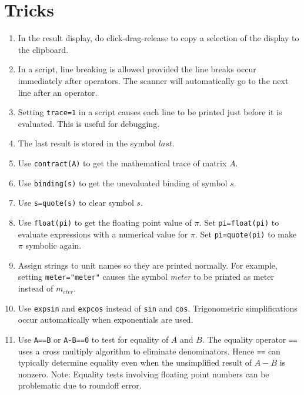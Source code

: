 \section{Tricks}
\begin{enumerate}

\item
In the result display, do click-drag-release to copy a selection of the display to the clipboard.

\item
In a script, line breaking is allowed provided the line breaks occur immediately after operators.
The scanner will automatically go to the next line after an operator.

\item
Setting \verb$trace=1$ in a script causes each line to be printed just before it is evaluated.
This is useful for debugging.

\item
The last result is stored in the symbol $last$.

\item
Use \verb$contract(A)$ to get the mathematical trace of matrix $A$.

\item
Use \verb$binding(s)$ to get the unevaluated binding of symbol $s$.

\item
Use \verb$s=quote(s)$ to clear symbol $s$.

\item
Use \verb$float(pi)$ to get the floating point value of $\pi$.
Set \verb$pi=float(pi)$ to evaluate expressions with a numerical value for $\pi$.
Set \verb$pi=quote(pi)$ to make $\pi$ symbolic again.

\item
Assign strings to unit names so they are printed normally.
For example, setting \verb$meter="meter"$ causes the symbol {\it meter}
to be printed as meter instead of $m_{eter}$.

\item
Use \verb$expsin$ and \verb$expcos$ instead of \verb$sin$ and \verb$cos$.
Trigonometric simplifications occur automatically when exponentials are used.

\item
Use \verb$A==B$ or \verb$A-B==0$ to test for equality of $A$ and $B$.
The equality operator \verb$==$ uses a cross multiply algorithm to eliminate denominators.
Hence \verb$==$ can typically determine equality even when the unsimplified result of $A-B$ is nonzero.
Note: Equality tests involving floating point numbers can be problematic
due to roundoff error.


\end{enumerate}

